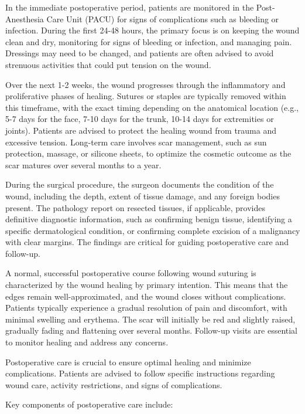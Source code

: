 In the immediate postoperative period, patients are monitored in the Post-Anesthesia Care Unit (PACU) for signs of complications such as bleeding or infection. During the first 24-48 hours, the primary focus is on keeping the wound clean and dry, monitoring for signs of bleeding or infection, and managing pain. Dressings may need to be changed, and patients are often advised to avoid strenuous activities that could put tension on the wound.

Over the next 1-2 weeks, the wound progresses through the inflammatory and proliferative phases of healing. Sutures or staples are typically removed within this timeframe, with the exact timing depending on the anatomical location (e.g., 5-7 days for the face, 7-10 days for the trunk, 10-14 days for extremities or joints). Patients are advised to protect the healing wound from trauma and excessive tension. Long-term care involves scar management, such as sun protection, massage, or silicone sheets, to optimize the cosmetic outcome as the scar matures over several months to a year.

During the surgical procedure, the surgeon documents the condition of the wound, including the depth, extent of tissue damage, and any foreign bodies present. The pathology report on resected tissues, if applicable, provides definitive diagnostic information, such as confirming benign tissue, identifying a specific dermatological condition, or confirming complete excision of a malignancy with clear margins. The findings are critical for guiding postoperative care and follow-up.

A normal, successful postoperative course following wound suturing is characterized by the wound healing by primary intention. This means that the edges remain well-approximated, and the wound closes without complications. Patients typically experience a gradual resolution of pain and discomfort, with minimal swelling and erythema. The scar will initially be red and slightly raised, gradually fading and flattening over several months. Follow-up visits are essential to monitor healing and address any concerns.

Postoperative care is crucial to ensure optimal healing and minimize complications. Patients are advised to follow specific instructions regarding wound care, activity restrictions, and signs of complications. 

Key components of postoperative care include:

